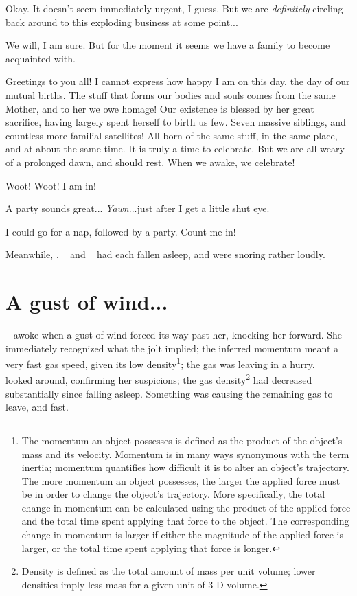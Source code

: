 \documentclass[main.tex]{subfiles}
\begin{document}
\newpara \Merope Okay.  It doesn't seem immediately urgent, I guess. But we are \textit{definitely} circling back around to this exploding business at some point...

\newpara \Maia We will, I am sure.  But for the moment it seems we have a family to become acquainted with.

\newpara \Maia Greetings to you all!  I cannot express how happy I am on this day, the day of our mutual births.  The stuff that forms our bodies and souls comes from the same Mother, and to her we owe homage!  Our existence is blessed by her great sacrifice, having largely spent herself to birth us few.  Seven massive siblings, and countless more familial satellites!  All born of the same stuff, in the same place, and at about the same time.  It is truly a time to celebrate.  But we are all weary of a prolonged dawn, and should rest.  When we awake, we celebrate!

\newpara \Merope  Woot!  Woot!  I am in!  

\newpara \Electra A party sounds great... \textit{Yawn}...just after I get a little shut eye.

\newpara \Sterope I could go for a nap, followed by a party.  Count me in!

\newpara \nar Meanwhile, \rmtaygete, \rmalcyone~ and \rmcelaeno~ had each fallen asleep, and were snoring rather loudly.


\section{A gust of wind...}

\newpara \nar \rmsterope~ awoke when a gust of wind forced its way past her, knocking her forward.  She immediately recognized what the jolt implied; the inferred momentum meant a very fast gas speed, given its low density\footnote{The momentum an object possesses is defined as the product of the object's mass and its velocity.  Momentum is in many ways synonymous with the term inertia; momentum quantifies how difficult it is to alter an object's trajectory.  The more momentum an object possesses, the larger the applied force must be in order to change the object's trajectory.  More specifically, the total change in momentum can be calculated using the product of the applied force and the total time spent applying that force to the object.  The corresponding change in momentum is larger if either the magnitude of the applied force is larger, or the total time spent applying that force is longer.}; the gas was leaving in a hurry.  \rmsterope~ looked around, confirming her suspicions; the gas density\footnote{Density is defined as the total amount of mass per unit volume; lower densities imply less mass for a given unit of 3-D volume.}  had decreased substantially since falling asleep.  Something was causing the remaining gas to leave, and fast.
\end{document}
